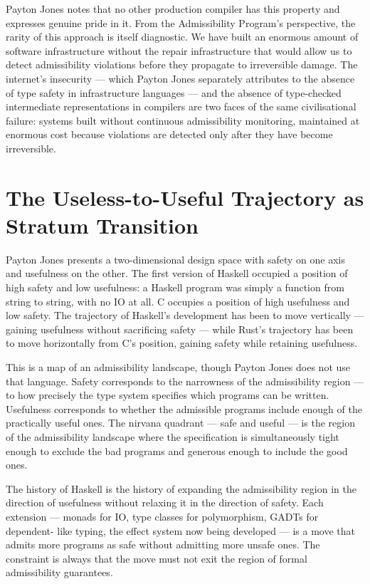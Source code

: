 \documentclass[12pt]{article}
\begin{document}
Payton Jones notes that no other production compiler has this property and
expresses genuine pride in it. From the Admissibility Program's perspective, the
rarity of this approach is itself diagnostic. We have built an enormous amount
of software infrastructure without the repair infrastructure that would allow us
to detect admissibility violations before they propagate to irreversible damage.
The internet's insecurity — which Payton Jones separately attributes to the
absence of type safety in infrastructure languages — and the absence of
type-checked intermediate representations in compilers are two faces of the same
civilisational failure: systems built without continuous admissibility monitoring,
maintained at enormous cost because violations are detected only after they have
become irreversible.

\section{The Useless-to-Useful Trajectory as Stratum Transition}

Payton Jones presents a two-dimensional design space with safety on one axis
and usefulness on the other. The first version of Haskell occupied a position
of high safety and low usefulness: a Haskell program was simply a function from
string to string, with no IO at all. C occupies a position of high usefulness
and low safety. The trajectory of Haskell's development has been to move
vertically — gaining usefulness without sacrificing safety — while Rust's
trajectory has been to move horizontally from C's position, gaining safety while
retaining usefulness.

This is a map of an admissibility landscape, though Payton Jones does not use
that language. Safety corresponds to the narrowness of the admissibility region
— to how precisely the type system specifies which programs can be written.
Usefulness corresponds to whether the admissible programs include enough of the
practically useful ones. The nirvana quadrant — safe and useful — is the region
of the admissibility landscape where the specification is simultaneously tight
enough to exclude the bad programs and generous enough to include the good ones.

The history of Haskell is the history of expanding the admissibility region in
the direction of usefulness without relaxing it in the direction of safety. Each
extension — monads for IO, type classes for polymorphism, GADTs for dependent-
like typing, the effect system now being developed — is a move that admits more
programs as safe without admitting more unsafe ones. The constraint is always
that the move must not exit the region of formal admissibility guarantees.
\end{document}

